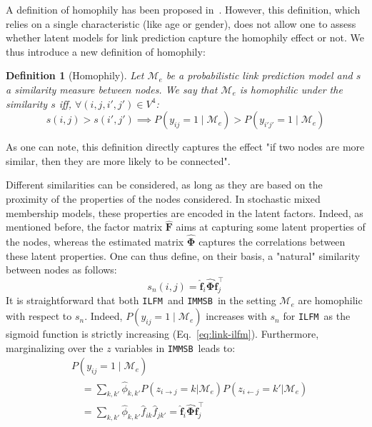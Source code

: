 \documentclass[journal]{IEEEtran}
\newcommand{\ifm}{\texttt{ILFM}}
\newcommand{\imb}{\texttt{IMMSB}}
\newcommand{\pr}{P}
\newcommand{\mat}[1]{\mathbf{#1}}
\newtheorem{definition}{Definition}[section]
\begin{document}
A definition of homophily has been proposed in~\cite{la2010randomization}. However, this definition, which relies on a single characteristic (like age or gender), does not allow one to assess whether latent models for link prediction capture the homophily effect or not. We thus introduce a new definition of homophily:
%
\begin{definition}[Homophily] \label{def:homophily}
	Let $\mathcal{M}_e$ be a probabilistic link prediction model and $s$ a similarity measure between nodes. We say that $\mathcal{M}_e$ is homophilic under the similarity $s$ iff, $\forall (i,j,i',j') \in V^4$:
%
\begin{equation}
s(i,j) > s(i',j')  \implies \pr(y_{ij}=1 \mid \mathcal{M}_e) > \pr(y_{i'j'}=1  \mid \mathcal{M}_e) \nonumber
\end{equation}
%
\end{definition}
%
\noindent As one can note, this definition directly captures the effect "if two nodes are more similar, then they are more likely to be connected". 

Different similarities can be considered, as long as they are based on the proximity of the properties of the nodes considered. In stochastic mixed membership models, these properties are encoded in the latent factors. Indeed, as mentioned before, the factor matrix $\mat{\hat{F}}$ aims at capturing some latent properties of the nodes, whereas the estimated matrix $\mat{\hat{\Phi}}$ captures the correlations between these latent properties. One can thus define, on their basis, a "natural" similarity between nodes as follows:
%
\begin{equation}
s_n(i,j) = \mat{\hat{f}}_{i} \mat{\hat{\Phi}} \mat{\hat{f}}_j^\top \nonumber
\end{equation}
%
It is straightforward that both \ifm\ and \imb\ in the setting $\mathcal{M}_e$ are homophilic with respect to $s_n$. Indeed, $\pr(y_{ij}=1 \mid \mathcal{M}_e)$ increases with $s_n$ for \ifm\ as the sigmoid function is strictly increasing (Eq.~\ref{eq:link-ilfm}). Furthermore, marginalizing over the $z$ variables in \imb\ leads to:
%
\begin{align}
&\pr(y_{ij} =1 \mid \mathcal{M}_e) \nonumber \\
& \quad = \sum_{k,k'} \hat{\phi}_{k,k'} \pr(z_{i \rightarrow j}=k | \mathcal{M}_e) \pr(z_{i \leftarrow j}=k' | \mathcal{M}_e) \nonumber \\
& \quad= \sum_{k,k'} \hat{\phi}_{k,k'} \hat{f}_{ik} \hat{f}_{jk'} = \mat{\hat{f}}_{i} \mat{\hat{\Phi}} \mat{\hat{f}}_j^\top \nonumber
\end{align}
\end{document}
